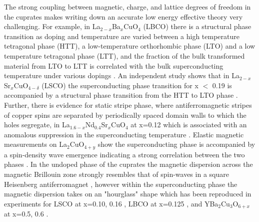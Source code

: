 \documentclass{article}
\begin{document}
The strong coupling between magnetic, charge, and lattice degrees of freedom in the cuprates makes writing down an accurate low energy effective theory very challenging. 
For example, in La$_{2-x}$Ba$_x$CuO$_4$ (LBCO) there is a structural phase transition as doping and temperature are varied between a high temperature tetragonal phase (HTT), a low-temperature orthorhombic phase (LTO) and a low temperature tetragonal phase (LTT), and the fraction of the bulk transformed material from LTO to LTT is correlated with the bulk superconducting temperature under various dopings \cite{PhysRevLett.62.2751}. 
An independent study shows that in La$_{2-x}$Sr$_x$CuO$_{4-\delta}$ (LSCO) the superconducting phase transition for x $<$ 0.19 is accompanied by a structural phase transition from the HTT to LTO phase \cite{PhysRevB.35.7191}. 
Further, there is evidence for static stripe phase, where antiferromagnetic stripes of copper spins are separated by periodically spaced domain walls to which the holes segregate, in La$_{1.6-x}$Nd$_{0.4}$Sr$_x$CuO$_4$ at x=0.12 which is associated with an anomalous suppression in the superconducting temperature \cite{Tranquada1995, PhysRevB.54.7489}. 
Elastic magnetic measurements on La$_2$CuO$_{4+y}$ show the superconducting phase is accompanied by a spin-density wave emergence indicating a strong correlation between the two phases \cite{PhysRevB.60.3643}. 
In the undoped phase of the cuprates the magnetic dispersion across the magnetic Brillouin zone strongly resembles that of spin-waves in a square Heisenberg antiferromagnet \cite{PhysRevLett.104.077002, PhysRevLett.102.167401, PhysRevLett.105.157006}, however within the superconducting phase the magnetic dispersion takes on an "hourglass" shape which has been reproduced in experiments for LSCO at x=0.10, 0.16 \cite{PhysRevLett.93.147002}, LBCO at x=0.125 \cite{Tranquada2004}, and YBa$_2$Cu$_3$O$_{6+x}$ at x=0.5, 0.6 \cite{PhysRevB.71.024522, Hayden2004}. 
\end{document}
